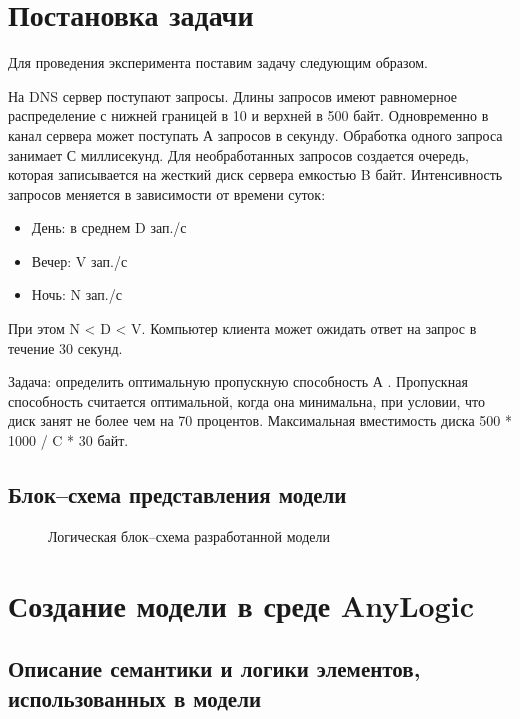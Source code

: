 \newpage
\section{Постановка задачи}
Для проведения эксперимента поставим задачу следующим образом.

На DNS сервер поступают запросы. Длины запросов имеют равномерное распределение с нижней границей
в 10 и верхней в 500 байт. Одновременно в канал сервера может поступать А запросов в секунду. Обработка одного
запроса занимает С миллисекунд. Для необработанных запросов создается очередь, которая записывается
на жесткий диск сервера емкостью B байт. Интенсивность запросов меняется в зависимости от времени суток:
\begin{itemize}
    \item День: в среднем D зап./с
    \item Вечер: V зап./с
    \item Ночь: N зап./с
\end{itemize}

При этом N < D < V. Компьютер клиента может ожидать ответ на запрос в течение 30 секунд.

Задача: определить оптимальную пропускную способность А . Пропускная способность считается оптимальной, когда она минимальна, при условии,
что диск занят не более чем на 70 процентов. Максимальная вместимость диска 500 * 1000 / C * 30  байт.

\subsection{Блок--схема представления модели}

\begin{figure} [h]
    \caption{Логическая блок--схема разработанной модели}
\end{figure}

\newpage
\section{Создание модели в среде AnyLogic}
\subsection{Описание семантики и логики элементов, использованных в модели}

